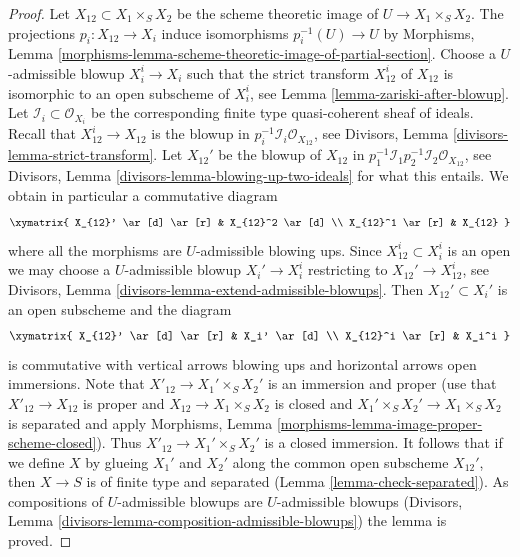 \begin{proof}
\medskip\noindent
Let $X_{12} \subset X_1 \times_S X_2$ be the scheme theoretic image
of $U \to X_1 \times_S X_2$. The projections $p_i : X_{12} \to X_i$
induce isomorphisms $p_i^{-1}(U) \to U$ by
Morphisms, Lemma
\ref{morphisms-lemma-scheme-theoretic-image-of-partial-section}.
Choose a $U$-admissible blowup $X_i^i \to X_i$ such that
the strict transform $X_{12}^i$ of $X_{12}$ is isomorphic to an
open subscheme of $X_i^i$, see
Lemma \ref{lemma-zariski-after-blowup}.
Let $\mathcal{I}_i \subset \mathcal{O}_{X_i}$ be the corresponding
finite type quasi-coherent sheaf of ideals.
Recall that $X_{12}^i \to X_{12}$ is the blowup in
$p_i^{-1}\mathcal{I}_i \mathcal{O}_{X_{12}}$, see
Divisors, Lemma \ref{divisors-lemma-strict-transform}.
Let $X_{12}'$ be the blowup of $X_{12}$ in
$p_1^{-1}\mathcal{I}_1 p_2^{-1}\mathcal{I}_2 \mathcal{O}_{X_{12}}$, see
Divisors, Lemma \ref{divisors-lemma-blowing-up-two-ideals}
for what this entails. We obtain in particular a commutative diagram
$$
\xymatrix{
X_{12}' \ar[d] \ar[r] & X_{12}^2 \ar[d] \\
X_{12}^1 \ar[r] & X_{12}
}
$$
where all the morphisms are $U$-admissible blowing ups.
Since $X_{12}^i \subset X_i^i$ is an open we may choose a $U$-admissible blowup
$X_i' \to X_i^i$ restricting to $X_{12}' \to X_{12}^i$, see
Divisors, Lemma \ref{divisors-lemma-extend-admissible-blowups}.
Then $X_{12}' \subset X_i'$ is an open subscheme and the diagram
$$
\xymatrix{
X_{12}' \ar[d] \ar[r] & X_i' \ar[d] \\
X_{12}^i \ar[r] & X_i^i
}
$$
is commutative with vertical arrows blowing ups and horizontal arrows
open immersions. Note that $X'_{12} \to X_1' \times_S X_2'$ is
an immersion and proper (use that $X'_{12} \to X_{12}$ is proper
and $X_{12} \to X_1 \times_S X_2$ is closed and $X_1' \times_S X_2' \to
X_1 \times_S X_2$ is separated and apply Morphisms, Lemma
\ref{morphisms-lemma-image-proper-scheme-closed}).
Thus $X'_{12} \to  X_1' \times_S X_2'$ is a closed immersion.
It follows that if we define $X$ by glueing $X_1'$ and $X_2'$
along the common open subscheme $X_{12}'$, then $X \to S$ is of finite type
and separated (Lemma \ref{lemma-check-separated}).
As compositions of $U$-admissible blowups are $U$-admissible blowups
(Divisors, Lemma \ref{divisors-lemma-composition-admissible-blowups})
the lemma is proved.
\end{proof}
